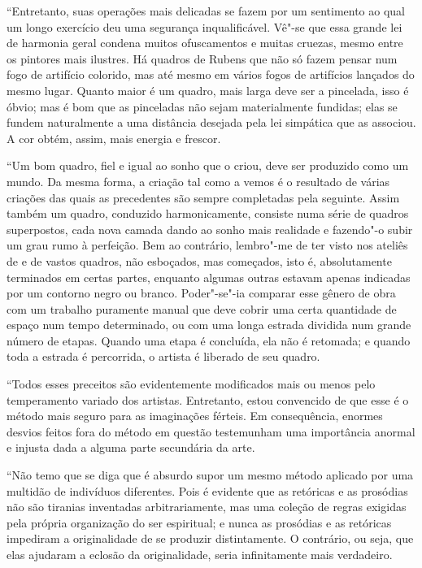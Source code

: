 “Entretanto, suas operações mais delicadas se fazem por um sentimento ao
qual um longo exercício deu uma segurança inqualificável. Vê"-se que
essa grande lei de harmonia geral condena muitos ofuscamentos e muitas
cruezas, mesmo entre os pintores mais ilustres. Há quadros de Rubens
que não só fazem pensar num fogo de artifício colorido, mas até mesmo
em vários fogos de artifícios lançados do mesmo lugar. Quanto maior é
um quadro, mais larga deve ser a pincelada, isso é óbvio; mas é bom que
as pinceladas não sejam materialmente fundidas; elas se fundem
naturalmente a uma distância desejada pela lei simpática que as
associou. A cor obtém, assim, mais energia e frescor.

“Um bom quadro, fiel e igual ao sonho que o criou, deve ser produzido
como um mundo. Da mesma forma, a criação tal como a vemos é o resultado
de várias criações das quais as precedentes são sempre completadas pela
seguinte. Assim também um quadro, conduzido harmonicamente, consiste
numa série de quadros superpostos, cada nova camada dando ao sonho mais
realidade e fazendo"-o subir um grau rumo à perfeição. Bem ao contrário,
lembro"-me de ter visto nos ateliês de  e de 
vastos quadros, não esboçados, mas começados, isto é, absolutamente
terminados em certas partes, enquanto algumas outras estavam apenas
indicadas por um contorno negro ou branco. Poder"-se"-ia comparar esse
gênero de obra com um trabalho puramente manual que deve cobrir uma
certa quantidade de espaço num tempo determinado, ou com uma longa
estrada dividida num grande número de etapas. Quando uma etapa é
concluída, ela não é retomada; e quando toda a estrada é percorrida, o
artista é liberado de seu quadro.

“Todos esses preceitos são evidentemente modificados mais ou menos pelo
temperamento variado dos artistas. Entretanto, estou convencido de que
esse é o método mais seguro para as imaginações férteis. Em
consequência, enormes desvios feitos fora do método em questão
testemunham uma importância anormal e injusta dada a alguma parte
secundária da arte.

“Não temo que se diga que é absurdo supor um mesmo método aplicado por
uma multidão de indivíduos diferentes. Pois é evidente que as retóricas
e as prosódias não são tiranias inventadas arbitrariamente, mas uma
coleção de regras exigidas pela própria organização do ser espiritual;
e nunca as prosódias e as retóricas impediram a originalidade de se
produzir distintamente. O contrário, ou seja, que elas ajudaram a
eclosão da originalidade, seria infinitamente mais verdadeiro.

